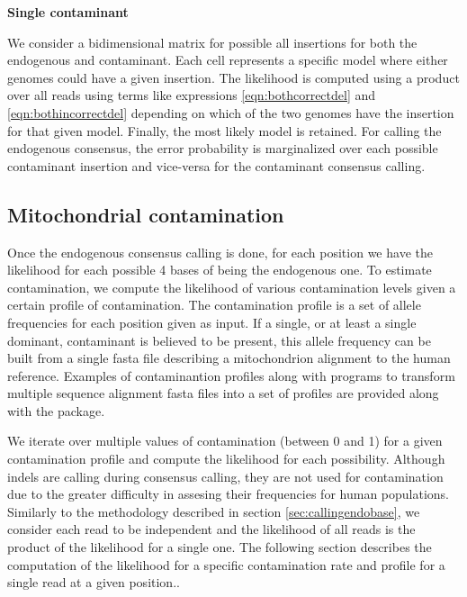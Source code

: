 \documentclass[a4paper,12pt]{article}
\begin{document}
{{\bf Single contaminant}

We consider a bidimensional matrix for possible all insertions for both the endogenous and contaminant. Each cell represents a specific model where either genomes could have a given insertion. The likelihood is computed using a product over all reads using terms like expressions \ref{eqn:bothcorrectdel} and \ref{eqn:bothincorrectdel} depending on which of the two genomes have the insertion for that given model. Finally, the most likely model is retained. For calling the endogenous consensus, the error probability is marginalized over each possible contaminant insertion and vice-versa for the contaminant consensus calling. 








\subsection{Mitochondrial contamination}

Once the endogenous consensus calling is done, for each position we have the likelihood for each possible 4 bases of being the endogenous one. To estimate contamination, we compute the likelihood of various contamination levels given a certain profile of contamination. The contamination profile is a set of allele frequencies for each position given as input. If a single, or at least a single dominant, contaminant is believed to be present, this allele frequency can be built from a single fasta file describing a mitochondrion alignment to the human reference.  Examples of contaminantion profiles along with programs to transform multiple sequence alignment fasta files into a set of profiles are provided along with the package. 

We iterate over multiple values of contamination (between 0 and 1) for a given contamination profile and compute the likelihood for each possibility. Although indels are calling during consensus calling, they are not used for contamination due to the greater difficulty in assesing their frequencies for human populations. Similarly to the methodology described in section \ref{sec:callingendobase}, we consider each read to be independent and the likelihood of all reads is the product of the likelihood for a single one. The following section describes the computation of the likelihood for a specific contamination rate and profile for a single read at a given position.. 

}
\end{document}
